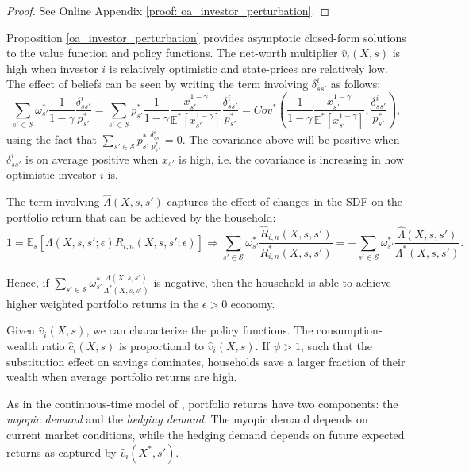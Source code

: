 \begin{proof}
See Online Appendix \ref{proof: oa_investor_perturbation}.
\end{proof}

Proposition \ref{oa_investor_perturbation} provides asymptotic closed-form solutions to the value function and policy functions. 
The net-worth multiplier $\hat{v}_i(X,s)$ is high when investor $i$ is relatively optimistic and state-prices are relatively low. 
The effect of beliefs can be seen by writing the term involving $\delta_{ss'}^i$ as follows:
\begin{equation}
    \sum_{s'\in \mathcal{S}} \omega^*_{s'} \frac{1}{1-\gamma} \frac{\delta_{ss'}^i}{p_{s'}^*} = \sum_{s'\in \mathcal{S}} p_{s'}^* \frac{1}{1-\gamma} \frac{x_{s'}^{1-\gamma}}{\mathbb{E}^*[x_{s'}^{1-\gamma}]} \frac{\delta_{ss'}^i}{p_{s'}^*}  =  Cov^*\left(\frac{1}{1-\gamma} \frac{x_{s'}^{1-\gamma}}{\mathbb{E}^*[x_{s'}^{1-\gamma}]},\frac{\delta_{ss'}^i}{p_{s'}^*} \right),
\end{equation}
using the fact that $\sum_{s'\in \mathcal{S}} p_{s'}^* \frac{\delta_{ss'}^i}{p_{s'}^*} = 0$. 
The covariance above will be positive when $\delta_{ss'}^i$ is on average positive when $x_{s'}$ is high, i.e. the covariance is increasing in how optimistic investor $i$ is. 

The term involving $\hat{\Lambda}(X,s,s')$ captures the effect of changes in the SDF on the portfolio return that can be achieved by the household:\small
\begin{equation}
    1 = \mathbb{E}_s\left[ \Lambda(X,s,s';\epsilon) R_{i,n}(X,s,s';\epsilon) \right] \Rightarrow
    \sum_{s'\in\mathcal{S}} \omega_{s'}^* \frac{\hat{R}_{i,n}(X,s,s')}{R^*_{i,n}(X,s,s')} = - \sum_{s'\in\mathcal{S}} \omega_{s'}^* \frac{\hat{\Lambda}(X,s,s')}{\Lambda^*(X,s,s')}.
\end{equation}

Hence, if $\sum_{s'\in\mathcal{S}} \omega_{s'}^* \frac{\hat{\Lambda}(X,s,s')}{\Lambda^*(X,s,s')}$ is negative, then the household is able to achieve higher weighted portfolio returns in the $\epsilon > 0$ economy.

Given $\hat{v}_i(X,s)$, we can characterize the policy functions. The consumption-wealth ratio $\hat{c}_i(X,s)$ is proportional to $\hat{v}_i(X,s)$. If $\psi > 1$, such that the substitution effect on savings dominates,  households save a larger fraction of their wealth when average portfolio returns are high. 

As in the continuous-time model of \citet{merton1992continuous}, portfolio returns have two components: the \textit{myopic demand} and the \textit{hedging demand}. 
The myopic demand depends on current market conditions, while the hedging demand depends on future expected returns as captured by $\hat{v}_i(X^*,s')$.

